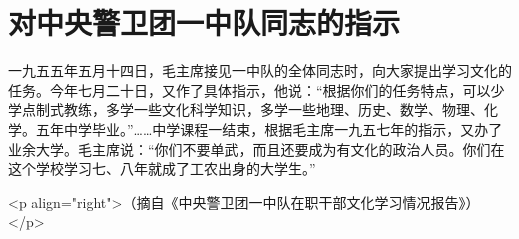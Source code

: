 \section[对中央警卫团一中队同志的指示（一九五五年七月二十日）]{对中央警卫团一中队同志的指示}


一九五五年五月十四日，毛主席接见一中队的全体同志时，向大家提出学习文化的任务。今年七月二十日，又作了具体指示，他说：“根据你们的任务特点，可以少学点制式教练，多学一些文化科学知识，多学一些地理、历史、数学、物理、化学。五年中学毕业。”……中学课程一结束，根据毛主席一九五七年的指示，又办了业余大学。毛主席说：“你们不要单武，而且还要成为有文化的政治人员。你们在这个学校学习七、八年就成了工农出身的大学生。”

<p align="right">（摘自《中央警卫团一中队在职干部文化学习情况报告》）</p>


